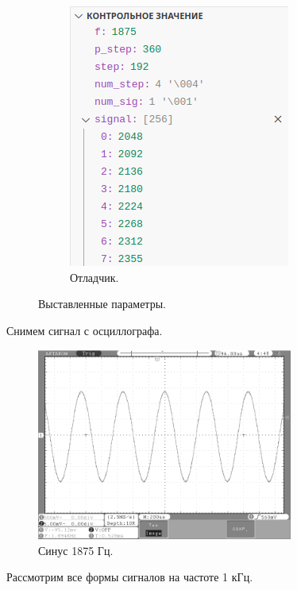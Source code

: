 \begin{figure}[H]
\begin{subfigure}[H]{0.5\textwidth}
         \includegraphics[width=0.8\textwidth]{../image/test4_o_f.png}
         \caption{Отладчик.}
     \end{subfigure}
        \caption{Выставленные параметры.}
	\end{figure}
	
	Снимем сигнал с осциллографа.
	\begin{figure}[H]
    \centering
    \includegraphics[width=0.75\textwidth]{../image/1875.bmp}
    \caption{Синус 1875 Гц.}
	\end{figure}	
	
	Рассмотрим все формы сигналов на частоте 1 кГц.

